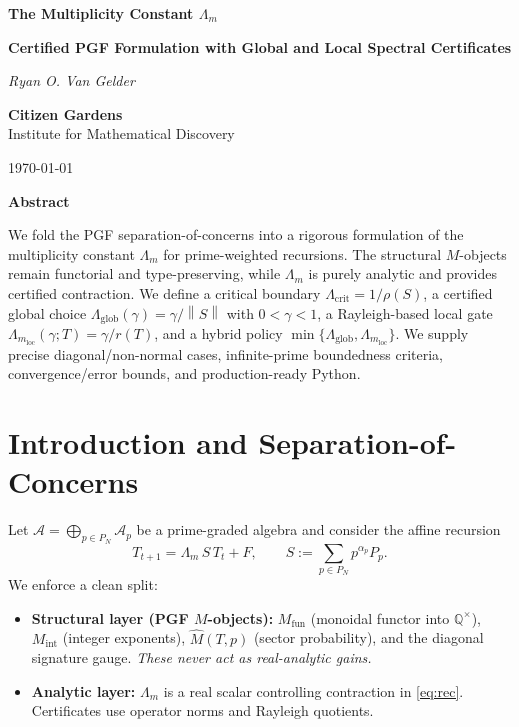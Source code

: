 \documentclass[11pt]{article}
\theoremstyle{definition}
\newcommand{\A}{\mathcal{A}}
\newcommand{\Mfun}{M_{\mathrm{fun}}}
\newcommand{\Mint}{M_{\mathrm{int}}}
\newcommand{\Mhat}{\widehat{M}}
\newcommand{\Lcrit}{\Lambda_{\mathrm{crit}}}
\newcommand{\Lglob}{\Lambda_{\mathrm{glob}}}
\newcommand{\Lm}{\Lambda_m}
\newcommand{\norm}[1]{\left\lVert #1\right\rVert}
\begin{document}
\begin{titlepage}
    \centering

    {\Huge\bfseries The Multiplicity Constant $\Lm$ \par}
    \vspace{0.5cm}
    {\LARGE\bfseries Certified PGF Formulation with Global and Local Spectral Certificates}\\
  \vspace{2cm}
    {\LARGE\itshape Ryan O. Van Gelder \par}
    \vspace{1cm}
    {\Large\bfseries Citizen Gardens} \\
    \vspace{0.5cm}
    \Large{Institute for Mathematical Discovery} \\ 
    \vspace{0.5cm}
    {\normalsize \today \par}

 \vfill

    {\bfseries Abstract \par}
    \vspace{0.5em}
    \begin{minipage}{0.85\textwidth}
        \small
We fold the PGF separation-of-concerns into a rigorous formulation of the multiplicity constant $\Lm$ for prime-weighted recursions. The structural $M$-objects remain functorial and type-preserving, while $\Lm$ is purely analytic and provides certified contraction. We define a critical boundary $\Lcrit=1/\rho(S)$, a certified global choice $\Lglob(\gamma)=\gamma/\norm{S}$ with $0<\gamma<1$, a Rayleigh-based local gate $\Lm_{\mathrm{loc}}(\gamma;T)=\gamma/r(T)$, and a hybrid policy $\min\{\Lglob,\Lm_{\mathrm{loc}}\}$. We supply precise diagonal/non-normal cases, infinite-prime boundedness criteria, convergence/error bounds, and production-ready Python.

 \end{minipage}
\end{titlepage}
\newpage

\tableofcontents

\section{Introduction and Separation-of-Concerns}
Let $\A=\bigoplus_{p\in P_N}\A_p$ be a prime-graded algebra and consider the affine recursion
\begin{equation}\label{eq:rec}
  T_{t+1}=\Lm\,S\,T_t+F,\qquad S:=\sum_{p\in P_N} p^{\alpha_p} P_p.
\end{equation}
We enforce a clean split:
\begin{itemize}[leftmargin=*,nosep]
  \item \textbf{Structural layer (PGF $M$-objects):} $\Mfun$ (monoidal functor into $\mathbb{Q}^\times$), $\Mint$ (integer exponents), $\Mhat(T,p)$ (sector probability), and the diagonal signature gauge. \emph{These never act as real-analytic gains.}
  \item \textbf{Analytic layer:} $\Lm$ is a real scalar controlling contraction in \eqref{eq:rec}. Certificates use operator norms and Rayleigh quotients.
\end{itemize}
\end{document}
